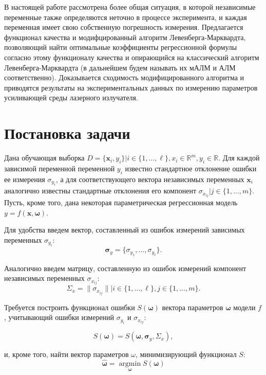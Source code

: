 \documentclass[11pt,a4paper]{article}
\newcommand{\bomega}{\boldsymbol{\omega}}
\begin{document}
В настоящей работе рассмотрена более общая ситуация, в которой независимые
переменные также определяются неточно в процессе эксперимента, и каждая переменная
имеет свою собственную
погрешность измерения. Предлагается функционал качества и модифцированный алгоритм
Левенберга-Марквардта, позволяющий найти оптимальные коэффициенты регрессионной
формулы согласно этому
функционалу качества и опирающийся на классический алгоритм
Левенберга-Марквардта (в дальнейшем будем называть их мАЛМ и АЛМ соответственно).
Доказывается сходимость модифицированного алгоритма и приводятся
результаты на экспериментальных данных по измерению параметров усиливающей
среды лазерного излучателя.

\section{Постановка задачи}

Дана обучающая выборка $D = \{ \mathbf{x}_i, y_i \} | i \in \{ 1, \dots, \ell \}, x_i \in \mathbb{R}^m, y_i \in \mathbb{R}$.
Для каждой зависимой переменной переменной $y_i$ известно
стандартное отклонение ошибки ее измерения $\sigma_{y_i}$, а для соответствующего
вектора независимых переменных $\mathbf{x}_i$ аналогично известны стандартные
отклонения его компонент $\sigma_{x_{ij}} | j \in \{ 1, \dots, m \}$.
Пусть, кроме того, дана некоторая параметрическая регрессионная модель
$y = f (\mathbf{x}, \bomega)$.

Для удобства введем вектор, составленный из ошибок измерений зависимых переменных
$\sigma_{y_i}$:
\[
  \boldsymbol{\sigma}_y = \{ \sigma_{y_1}, \dots, \sigma_{y_{\ell}} \}.
\]

Аналогично введем матрицу, составленную из ошибок измерений компонент
независимых переменных $\sigma_{x_{ij}}$:
\[
  \Sigma_x = \| \sigma_{x_{ij}} \| | i \in \{ 1, \dots, \ell \}, j \in \{ 1, \dots, m \}.
\]

Требуется построить функционал ошибки $S(\bomega)$ вектора параметров
$\bomega$ модели $f$, учитывающий ошибки измерений $\sigma_{y_i}$ и
$\sigma_{x_{ij}}$:

\begin{equation}
  S(\bomega) = S(\bomega, \boldsymbol{\sigma}_y, \Sigma_x),
\end{equation}

и, кроме того, найти вектор параметров $\omega$, минимизирующий функционал
$S$:
\begin{equation}
  \hat{\bomega} = \mathop{\arg \min}\limits_{\bomega} S(\bomega)
\end{equation}
\end{document}
